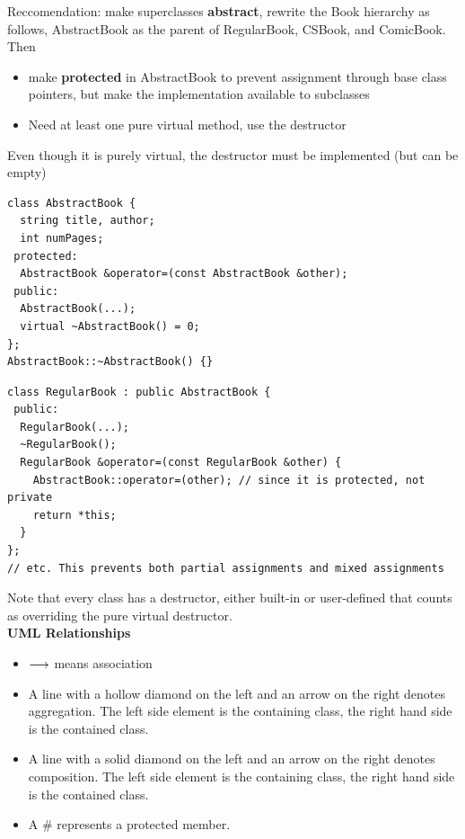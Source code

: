 \documentclass[english, 11pt]{article}
\begin{document}
Reccomendation: make superclasses \textbf{abstract}, rewrite the Book hierarchy as follows, AbstractBook as the parent of RegularBook, CSBook, and ComicBook. Then
\begin{itemize}
  \item make  \textbf{protected} in AbstractBook to prevent assignment through base class pointers, but make the implementation available to subclasses
  \item Need at least one pure virtual method, use the destructor
\end{itemize}
\begin{note}
  Even though it is purely virtual, the destructor must be implemented (but can be empty)
\end{note}
\begin{lstlisting}
class AbstractBook {
  string title, author;
  int numPages;
 protected:
  AbstractBook &operator=(const AbstractBook &other);
 public:
  AbstractBook(...);
  virtual ~AbstractBook() = 0;
};
AbstractBook::~AbstractBook() {}
\end{lstlisting}

\begin{lstlisting}
class RegularBook : public AbstractBook {
 public:
  RegularBook(...);
  ~RegularBook();
  RegularBook &operator=(const RegularBook &other) {
    AbstractBook::operator=(other); // since it is protected, not private
    return *this;
  }
};
// etc. This prevents both partial assignments and mixed assignments
\end{lstlisting}

Note that every class has a destructor, either built-in or user-defined that counts as overriding the pure virtual destructor. \\

\textbf{UML Relationships} \\

\begin{itemize}
  \item $\longrightarrow$ means association
  \item A line with a hollow diamond on the left and an arrow on the right denotes aggregation. The left side element is the containing class, the right hand side is the contained class.
  \item A line with a solid diamond on the left and an arrow on the right denotes composition. The left side element is the containing class, the right hand side is the contained class.
  \item A $\#$ represents a protected member.
\end{itemize}
\end{document}
